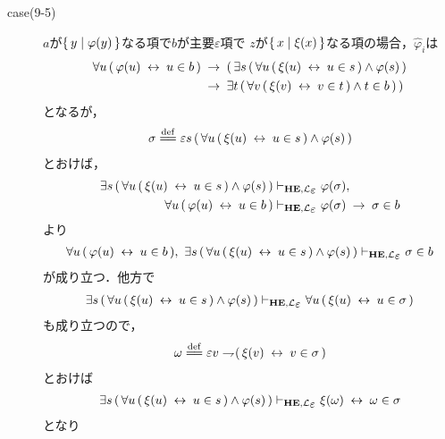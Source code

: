 \begin{metaprf}
\begin{description}
\begin{description}
					\item[case(9-5)] $a$が$\{\, y \mid \varphi(y)\, \}$なる項で$b$が主要$\varepsilon$項で
						$z$が$\{\, x \mid \xi(x)\, \}$なる項の場合，$\widehat{\varphi}_{i}$は
						\begin{align}
							\forall u\, (\, \varphi(u) \hspace{0.25em}\leftrightarrow\hspace{0.25em} u \in b\, ) 
							&\hspace{0.25em}\rightarrow\hspace{0.25em} (\, \exists s\, (\, \forall u\, (\, \xi(u) \hspace{0.25em}\leftrightarrow\hspace{0.25em} u \in s\, ) \wedge \varphi(s)\, ) \\
							&\hspace{0.25em}\rightarrow\hspace{0.25em} \exists t\, (\, \forall v\, (\, \xi(v) \hspace{0.25em}\leftrightarrow\hspace{0.25em} v \in t\, ) \wedge t \in b\, )\, )
						\end{align}
						となるが，
						\begin{align}
							\sigma \defeq \varepsilon s\, (\, \forall u\, (\, \xi(u) \lrarrow u \in s\, ) \wedge \varphi(s)\, )
						\end{align}
						とおけば，
						\begin{align}
							\exists s\, (\, \forall u\, (\, \xi(u) \lrarrow u \in s\, ) \wedge \varphi(s)\, ) 
							&\provable{\mbox{{\bf HE}},\lang{\varepsilon}} \varphi(\sigma), \\
							\forall u\, (\, \varphi(u) \lrarrow u \in b\, )
							&\provable{\mbox{{\bf HE}},\lang{\varepsilon}} \varphi(\sigma) \rarrow \sigma \in b
						\end{align}
						より
						\begin{align}
							\forall u\, (\, \varphi(u) \lrarrow u \in b\, ),\ 
							\exists s\, (\, \forall u\, (\, \xi(u) \lrarrow u \in s\, ) \wedge \varphi(s)\, ) 
							\provable{\mbox{{\bf HE}},\lang{\varepsilon}} \sigma \in b
						\end{align}
						が成り立つ．他方で
						\begin{align}
							\exists s\, (\, \forall u\, (\, \xi(u) \lrarrow u \in s\, ) \wedge \varphi(s)\, ) 
							\provable{\mbox{{\bf HE}},\lang{\varepsilon}} \forall u\, (\, \xi(u) \lrarrow u \in \sigma\, )
						\end{align}
						も成り立つので，
						\begin{align}
							\omega \defeq \varepsilon v \negation (\, \xi(v) \lrarrow v \in \sigma\, )
						\end{align}
						とおけば
						\begin{align}
							\exists s\, (\, \forall u\, (\, \xi(u) \lrarrow u \in s\, ) \wedge \varphi(s)\, ) 
							\provable{\mbox{{\bf HE}},\lang{\varepsilon}} \xi(\omega) \lrarrow \omega \in \sigma
						\end{align}
						となり
						\begin{align}

\end{align}
\end{description}
\end{description}
\end{metaprf}

